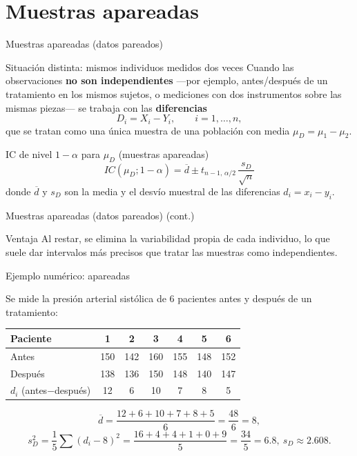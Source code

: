 \documentclass[aspectratio=169,11pt]{beamer}
\begin{document}
\section{Muestras apareadas}

\begin{frame}{Muestras apareadas (datos pareados)}
\begin{block}{Situación distinta: mismos individuos medidos dos veces}
Cuando las observaciones \textbf{no son independientes} —por ejemplo, antes/después de un tratamiento en los mismos sujetos, o mediciones con dos instrumentos sobre las mismas piezas— se trabaja con las \textbf{diferencias}
\[
D_i = X_i - Y_i, \qquad i=1,\dots,n,
\]
que se tratan como una única muestra de una población con media $\mu_D=\mu_1-\mu_2$.
\end{block}

\begin{alertblock}{IC de nivel $1-\alpha$ para $\mu_D$ (muestras apareadas)}
\[
IC(\mu_D;1-\alpha) = \overline d \pm t_{n-1,\,\alpha/2}\,\frac{s_D}{\sqrt n}
\]
donde $\overline d$ y $s_D$ son la media y el desvío muestral de las diferencias $d_i=x_i-y_i$.
\end{alertblock}

\end{frame}

\begin{frame}{Muestras apareadas (datos pareados) (cont.)}
\begin{block}{Ventaja}
Al restar, se elimina la variabilidad propia de cada individuo, lo que suele dar intervalos más precisos que tratar las muestras como independientes.
\end{block}
\end{frame}

\begin{frame}{Ejemplo numérico: apareadas}
\begin{example}
Se mide la presión arterial sistólica de $6$ pacientes antes y después de un tratamiento:
\begin{center}
\begin{tabular}{lcccccc}
\toprule
Paciente & 1 & 2 & 3 & 4 & 5 & 6 \\
\midrule
Antes & 150 & 142 & 160 & 155 & 148 & 152 \\
Después & 138 & 136 & 150 & 148 & 140 & 147 \\
\midrule
$d_i$ (antes$-$después) & 12 & 6 & 10 & 7 & 8 & 5 \\
\bottomrule
\end{tabular}
\end{center}
\[
\overline d = \frac{12+6+10+7+8+5}{6} = \frac{48}{6}=8,
\]
\[
s_D^2 = \frac{1}{5}\sum (d_i-8)^2 = \frac{16+4+4+1+0+9}{5}=\frac{34}{5}=6.8,\ s_D\approx 2.608.
\]
\end{example}
\end{frame}
\end{document}
